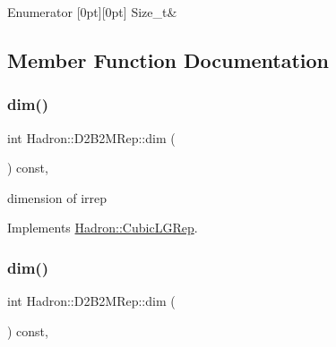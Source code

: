 \begin{DoxyEnumFields}{Enumerator}
[0pt][0pt]{}\mbox{\label{structHadron_1_1D2B2MRep_a0bd824cca58c32ff9b765ab2cf7f9e0ba5a1447942d01dcc553dae2d6f30fc50b}} 
Size\+\_\+t&\\
\hline

\end{DoxyEnumFields}


\subsection{Member Function Documentation}
\mbox{\label{structHadron_1_1D2B2MRep_a5beebf66fecabd7ee94b861df9f607c9}} 
\subsubsection{\texorpdfstring{dim()}{dim()}\hspace{0.1cm}{\footnotesize\ttfamily [1/3]}}
{\footnotesize\ttfamily int Hadron\+::\+D2\+B2\+M\+Rep\+::dim (\begin{DoxyParamCaption}{ }\end{DoxyParamCaption}) const\hspace{0.3cm}{\ttfamily [inline]}, {\ttfamily [virtual]}}

dimension of irrep 

Implements \mbox{\hyperlink{structHadron_1_1CubicLGRep_a3acbaea26503ed64f20df693a48e4cdd}{Hadron\+::\+Cubic\+L\+G\+Rep}}.

\mbox{\label{structHadron_1_1D2B2MRep_a5beebf66fecabd7ee94b861df9f607c9}} 
\subsubsection{\texorpdfstring{dim()}{dim()}\hspace{0.1cm}{\footnotesize\ttfamily [2/3]}}
{\footnotesize\ttfamily int Hadron\+::\+D2\+B2\+M\+Rep\+::dim (\begin{DoxyParamCaption}{ }\end{DoxyParamCaption}) const\hspace{0.3cm}{\ttfamily [inline]}, {\ttfamily [virtual]}}

